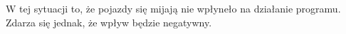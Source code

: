 \documentclass[11pt, a4paper]{article}
\begin{document}
W tej sytuacji to, że pojazdy się mijają nie wpłyneło na działanie programu. Zdarza się jednak, że wpływ będzie negatywny.
\begin{figure}[htbp!]
	\centering
	
	\hfill%
	\hfill%
	

\end{figure}
\end{document}

